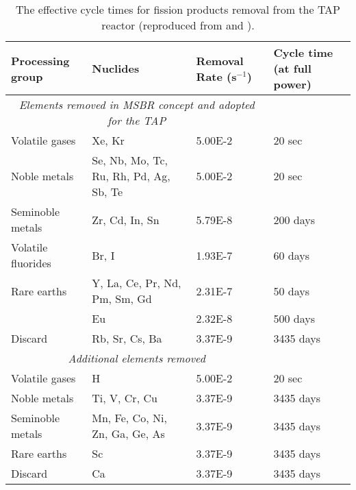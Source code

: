 \begin{table}[htbp!]
	\centering
	\caption{The effective cycle times for fission products removal  from the 
		\gls{TAP} reactor (reproduced from \cite{betzler_implementation_2017} 
		and 
		\cite{transatomic_power_corporation_neutronics_2016}).}
	\begin{tabular}{p{} p{} p{} 
			p{}}
		\hline 
		\textbf{Processing group} & \qquad\qquad\qquad \textbf{Nuclides} & 
		\textbf{Removal Rate (s$^{-1}$)} & \textbf{Cycle time (at full power)} 
		\\ [5pt] \hline 
		\multicolumn{3}{c}{\textit{Elements removed in \gls{MSBR} concept and 
				adopted for the \gls{TAP}} \cite{robertson_conceptual_1971}} \\
		Volatile gases & Xe, Kr								  & 5.00E-2 & 20 
		sec \\ [5pt]
		Noble metals & Se, Nb, Mo, Tc, Ru, Rh, Pd, Ag, Sb, Te & 5.00E-2 & 20 
		sec \\ [5pt]
		Seminoble metals & Zr, Cd, In, Sn	  				  & 5.79E-8 & 200 
		days \\ [5pt]
		Volatile fluorides & Br, I 							  & 1.93E-7 & 60 
		days \\ [5pt]
		Rare earths & Y, La, Ce, Pr, Nd, Pm, Sm, Gd           & 2.31E-7 & 50 
		days \\ [5pt]
		\qquad & Eu & 2.32E-8 & 500 days \\ [5pt]
		Discard & Rb, Sr, Cs, Ba & 3.37E-9 & 3435 days \\ [5pt] 
		\hline
		
		\multicolumn{3}{c}{\textit{Additional elements removed} 
			\cite{transatomic_power_corporation_neutronics_2016, 
				betzler_implementation_2017}  } \\
		Volatile gases & H								  	& 5.00E-2 & 20 
		sec    \\ [5pt]
		Noble metals & Ti, V, Cr, Cu						& 3.37E-9 & 3435 
		days \\ [5pt]
		Seminoble metals & Mn, Fe, Co, Ni, Zn, Ga, Ge, As   & 3.37E-9 & 3435 
		days \\ [5pt]
		Rare earths & Sc									& 3.37E-9 & 3435 
		days \\ [5pt]
		Discard & Ca										& 3.37E-9 & 3435 
		days \\ [5pt] 
		\hline
	\end{tabular}
	\label{tab:reprocessing_list}
	\vspace{-0.9em}
\end{table}

